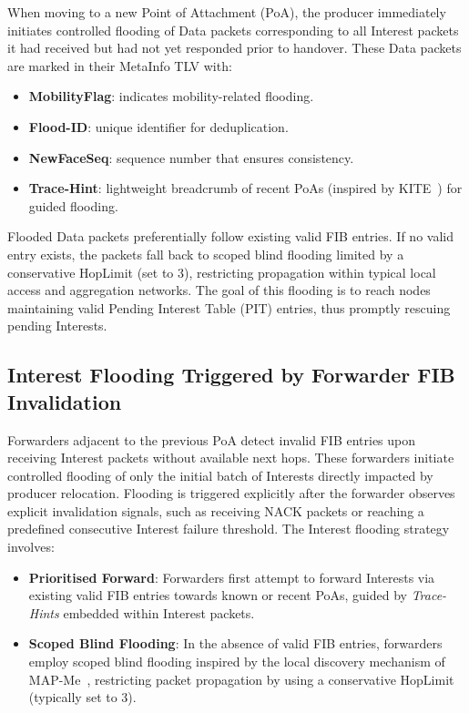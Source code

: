 \documentclass[conference]{IEEEtran}
\begin{document}
When moving to a new Point of Attachment (PoA), the producer immediately initiates controlled flooding of Data packets corresponding to all Interest packets it had received but had not yet responded prior to handover. These Data packets are marked in their MetaInfo TLV with:
\begin{itemize}
\item \textbf{MobilityFlag}: indicates mobility-related flooding.
\item \textbf{Flood-ID}: unique identifier for deduplication.
\item \textbf{NewFaceSeq}: sequence number that ensures consistency.
\item \textbf{Trace-Hint}: lightweight breadcrumb of recent PoAs (inspired by KITE~\cite{zhang:2018:kite}) for guided flooding.
\end{itemize}

Flooded Data packets preferentially follow existing valid FIB entries. If no valid entry exists, the packets fall back to scoped blind flooding limited by a conservative HopLimit (set to 3), restricting propagation within typical local access and aggregation networks. The goal of this flooding is to reach nodes maintaining valid Pending Interest Table (PIT) entries, thus promptly rescuing pending Interests.

\subsection{Interest Flooding Triggered by Forwarder FIB Invalidation}
\label{sec:solution:interest-flooding}

Forwarders adjacent to the previous PoA detect invalid FIB entries upon receiving Interest packets without available next hops. These forwarders initiate controlled flooding of only the initial batch of Interests directly impacted by producer relocation. Flooding is triggered explicitly after the forwarder observes explicit invalidation signals, such as receiving NACK packets or reaching a predefined consecutive Interest failure threshold.
The Interest flooding strategy involves:
\begin{itemize}
\item \textbf{Prioritised Forward}: Forwarders first attempt to forward Interests via existing valid FIB entries towards known or recent PoAs, guided by \textit{Trace-Hints} embedded within Interest packets.
\item \textbf{Scoped Blind Flooding}: In the absence of valid FIB entries, forwarders employ scoped blind flooding inspired by the local discovery mechanism of MAP-Me~\cite{auge:2016:map-me}, restricting packet propagation by using a conservative HopLimit (typically set to 3).
\end{itemize}
\end{document}
